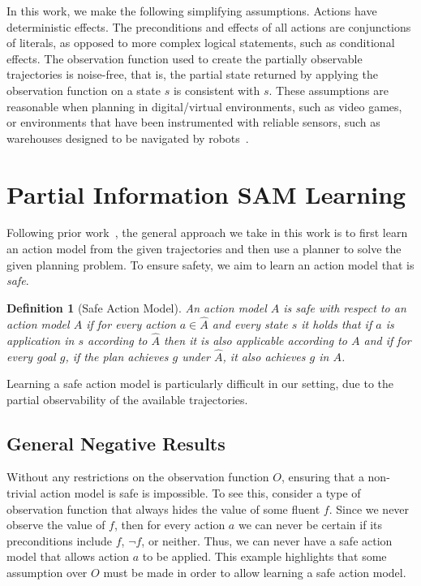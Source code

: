 \documentclass[letterpaper]{article} %
\newtheorem{definition}{Definition}
\begin{document}
In this work, we make the following simplifying assumptions. 
Actions have deterministic effects. 
The preconditions and effects of all actions are conjunctions of literals, as opposed to more complex logical statements, such as conditional effects. 
The observation function used to create the partially observable trajectories is noise-free, that is, the partial state returned by applying the observation function on a state $s$ is consistent with $s$. 
These assumptions are reasonable when planning in digital/virtual environments, such as video games, or environments that have been instrumented with reliable sensors, such as warehouses designed to be navigated by robots~\cite{li2020lifelong}. 






\section{Partial Information SAM Learning}
Following prior work~\cite{stern2017efficientAndSafe,juba2021safe}, the general approach we take in this work is to first learn an action model from the given trajectories and then use a planner to solve the given planning problem. 
To ensure safety, we aim to learn an action model that is \emph{safe}. 
\begin{definition}[Safe Action Model]
An action model $\hat{A}$ is safe with respect to an action model $A$ 
if for every action $a\in\hat{A}$ and every state $s$ it holds that 
if $a$ is application in $s$ according to $\hat{A}$ then it is also applicable according to $A$ and if for every goal $g$, if the plan achieves $g$ under $\hat{A}$, it also achieves $g$ in $A$. 
\end{definition}
Learning a safe action model is particularly difficult in our setting, due to the partial observability of the available trajectories. 

\subsection{General Negative Results}
Without any restrictions on the observation function $O$, ensuring that a non-trivial action model is safe is impossible. 
To see this, consider a type of observation function that always hides the value of some fluent $f$. 
Since we never observe the value of $f$, then for every action $a$ we can never be certain if its preconditions include $f$, $\neg f$, or neither.
Thus, we can never have a safe action model that allows action $a$ to be applied.  
This example highlights that some assumption over $O$ must be made in order to allow learning a safe action model. 
\end{document}
